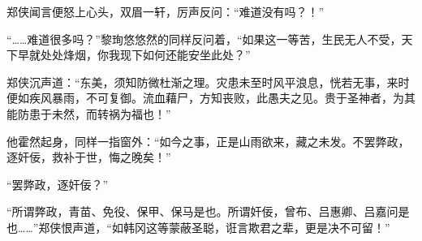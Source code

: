 郑侠闻言便怒上心头，双眉一轩，厉声反问：“难道没有吗？！”

“……难道很多吗？”黎珣悠悠然的同样反问着，“如果这一等苦，生民无人不受，天下早就处处烽烟，你我现下如何还能安坐此处？”

郑侠沉声道：“东美，须知防微杜渐之理。灾患未至时风平浪息，恍若无事，来时便如疾风暴雨，不可复御。流血藉尸，方知丧败，此愚夫之见。贵于圣神者，为其能防患于未然，而转祸为福也！”

他霍然起身，同样一指窗外：“如今之事，正是山雨欲来，藏之未发。不罢弊政，逐奸佞，救补于世，悔之晚矣！”

“罢弊政，逐奸佞？”

“所谓弊政，青苗、免役、保甲、保马是也。所谓奸佞，曾布、吕惠卿、吕嘉问是也……”郑侠恨声道，“如韩冈这等蒙蔽圣聪，诳言欺君之辈，更是决不可留！”

